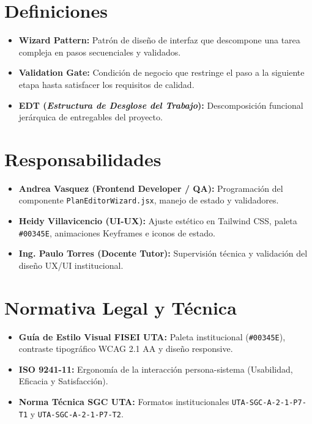 \documentclass[12pt,a4paper]{article}
\begin{document}
\section{Definiciones}
\begin{itemize}[leftmargin=1.5em, itemsep=2pt, topsep=2pt]
    \item \textbf{Wizard Pattern:} Patrón de diseño de interfaz que descompone una tarea compleja en pasos secuenciales y validados.
    \item \textbf{Validation Gate:} Condición de negocio que restringe el paso a la siguiente etapa hasta satisfacer los requisitos de calidad.
    \item \textbf{EDT (\textit{Estructura de Desglose del Trabajo}):} Descomposición funcional jerárquica de entregables del proyecto.
\end{itemize}

\section{Responsabilidades}
\begin{itemize}[leftmargin=1.5em, itemsep=2pt, topsep=2pt]
    \item \textbf{Andrea Vasquez (Frontend Developer / QA):} Programación del componente \texttt{PlanEditorWizard.jsx}, manejo de estado y validadores.
    \item \textbf{Heidy Villavicencio (UI-UX):} Ajuste estético en Tailwind CSS, paleta \texttt{\#00345E}, animaciones Keyframes e iconos de estado.
    \item \textbf{Ing. Paulo Torres (Docente Tutor):} Supervisión técnica y validación del diseño UX/UI institucional.
\end{itemize}

\section{Normativa Legal y Técnica}
\begin{itemize}[leftmargin=1.5em, itemsep=2pt]
    \item \textbf{Guía de Estilo Visual FISEI UTA:} Paleta institucional (\texttt{\#00345E}), contraste tipográfico WCAG 2.1 AA y diseño responsive.
    \item \textbf{ISO 9241-11:} Ergonomía de la interacción persona-sistema (Usabilidad, Eficacia y Satisfacción).
    \item \textbf{Norma Técnica SGC UTA:} Formatos institucionales \texttt{UTA-SGC-A-2-1-P7-T1} y \texttt{UTA-SGC-A-2-1-P7-T2}.
\end{itemize}
\end{document}

